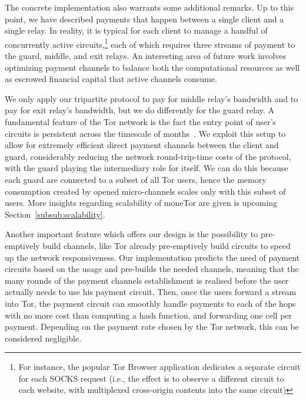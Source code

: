 The concrete implementation also warrants some additional remarks. Up to this
point, we have described payments that happen between a single client and a
single relay. In reality, it is typical for each client to manage a handful of
concurrently active circuits,\footnote{For instance, the popular Tor Browser
  application dedicates a separate circuit for each SOCKS request (i.e., the effect is to observe a different circuit to each website, with multiplexed cross-origin contents into the same circuit)}
each of which requires three streams of payment to the guard, middle, and exit relays. An interesting area of future work involves optimizing payment channels
to balance both the computational resources as well as escrowed financial
capital that active channels consume. 

We only apply our tripartite protocol to pay for middle relay's bandwidth and to pay for exit relay's bandwidth, but we do differently for the guard relay. A fundamental feature of the Tor network is the fact the entry point of user's circuits is persistent
across the timescale of months~\cite{wpes12-cogs}. We exploit this setup to allow for extremely
efficient direct payment channels between the client and guard, considerably
reducing the network round-trip-time costs of the protocol, with the guard playing the intermediary role for itself. We can do this because each guard are connected to a subset of all Tor users, hence the memory consumption created by opened micro-channels scales only with this subset of users. More insights regarding scalability of moneTor are given is upcoming Section~\ref{subsub:scalability}.

Another important feature which offers our design is the possibility to pre-emptively build channels, like Tor already pre-emptively build circuits to speed up the network responsiveness. Our implementation predicts the need of payment circuits based on the usage and pre-builds the needed channels, meaning that the many rounds of the payment channels establishment is realised before the user actually needs to use his payment circuit. Then, once the users forward a stream into Tor, the payment circuit can smoothly handle payments to each of the hops with no more cost than computing a hash function, and forwarding one cell per payment. Depending on the payment rate chosen by the Tor network, this can be considered negligible.
